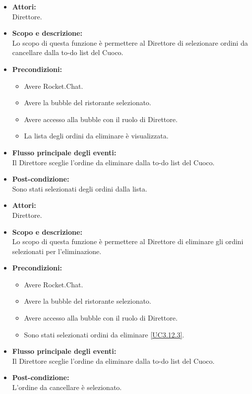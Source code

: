 
\begin{itemize}
	\item \textbf{Attori:}
	\\Direttore.
	\item \textbf{Scopo e descrizione:} 
	\\Lo scopo di questa funzione è permettere al Direttore di selezionare ordini da cancellare dalla to-do list del Cuoco.
	\item \textbf{Precondizioni:}
	\begin{itemize}
		\item Avere Rocket.Chat.
		\item Avere la bubble del ristorante selezionato.
		\item Avere accesso alla bubble con il ruolo di Direttore.
		\item La lista degli ordini da eliminare è visualizzata.
	\end{itemize}
	\item \textbf{Flusso principale degli eventi:}
	\\Il Direttore sceglie l'ordine da eliminare dalla to-do list del Cuoco.
	\item \textbf{Post-condizione:}
	\\Sono stati selezionati degli ordini dalla lista.
\end{itemize}


\begin{itemize}
	\item \textbf{Attori:}
	\\Direttore.
	\item \textbf{Scopo e descrizione:} 
	\\Lo scopo di questa funzione è permettere al Direttore di eliminare gli ordini selezionati per l'eliminazione.
	\item \textbf{Precondizioni:}
	\begin{itemize}
		\item Avere Rocket.Chat.
		\item Avere la bubble del ristorante selezionato.
		\item Avere accesso alla bubble con il ruolo di Direttore.
		\item Sono stati selezionati ordini da eliminare \ref{UC3.12.3}.
	\end{itemize}
	\item \textbf{Flusso principale degli eventi:}
	\\Il Direttore sceglie l'ordine da eliminare dalla to-do list del Cuoco.
	\item \textbf{Post-condizione:}
	\\L'ordine da cancellare è selezionato.
\end{itemize}

